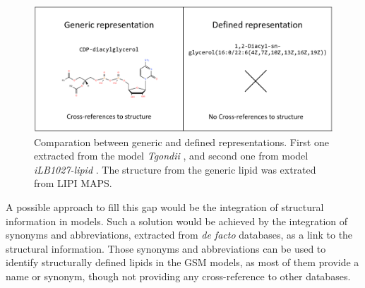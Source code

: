 \documentclass{llncs}
\begin{document}
\begin{figure}
    \includegraphics[width=\textwidth]{imagens/comparação.png}
    \caption{Comparation between generic and defined representations. First one extracted from the model \textit{Tgondii} \cite{Tymoshenko2015}, and second one from model \textit{iLB1027-lipid} \cite{Levering2016}. The structure from the generic lipid was extrated from LIPI MAPS.}
\end{figure}

A possible approach to fill this gap would be the integration of structural information in models. 
Such a solution would be achieved by the integration of synonyms and abbreviations, extracted from \textit{de facto} databases, as a link to the structural information. Those synonyms and abbreviations can be used to identify structurally defined lipids in the GSM models, as most of them provide a name or synonym, though not providing any cross-reference to other databases. 





\end{document}
